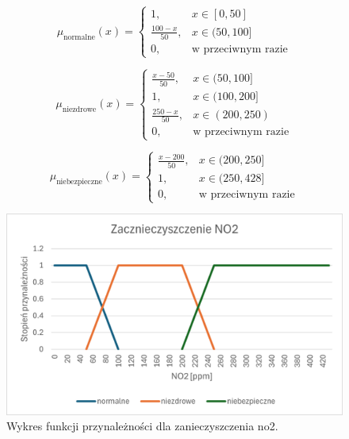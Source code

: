 \documentclass{article}
\begin{document}
\begin{enumerate}
    \begin{equation}
    \mu_{\text{normalne}}(x) =
    \begin{cases}
    1, & x \in [0, 50] \\
    \frac{100 - x}{50}, & x \in (50, 100] \\
    0, & \text{w przeciwnym razie}
    \end{cases}
    \end{equation}
    
    \begin{equation}
    \mu_{\text{niezdrowe}}(x) =
    \begin{cases}
    \frac{x - 50}{50}, & x \in (50, 100] \\
    1, & x \in (100, 200] \\
    \frac{250 - x}{50}, & x \in (200, 250) \\
    0, & \text{w przeciwnym razie}
    \end{cases}
    \end{equation}
    
    \begin{equation}
    \mu_{\text{niebezpieczne}}(x) =
    \begin{cases}
    \frac{x - 200}{50}, & x \in (200, 250] \\
    1, & x \in (250, 428] \\
    0, & \text{w przeciwnym razie}
    \end{cases}
    \end{equation}

        \begin{figure}[H]
    \centering
    \includegraphics[width=\textwidth]{img/no.png}
    \caption{Wykres funkcji przynależności dla zanieczyszczenia no2.}
    \end{figure}
        

\end{enumerate}
\end{document}
